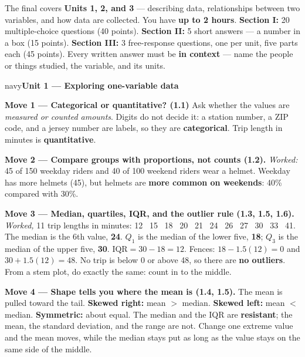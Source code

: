 \documentclass[12pt]{article}
\newcommand{\sghead}[2][10]{%
  \vspace{0.13in}
  \boxguard[#1]
  \begin{headlinebox}{navy}\color{white}\bfseries\small #2\end{headlinebox}
  \vspace{0.09in}}
\begin{document}

\vspace{0.12in}

\boxguard[9]
\begin{remindbox}
\small
The final covers \textbf{Units 1, 2, and 3} --- describing data, relationships between two
variables, and how data are collected. You have \textbf{up to 2 hours}. \textbf{Section I:} 20
multiple-choice questions (40 points). \textbf{Section II:} 5 short answers --- a number in a
box (15 points). \textbf{Section III:} 3 free-response questions, one per unit, five parts each
(45 points). Every written answer must be \textbf{in context} --- name the people or things
studied, the variable, and its units.
\end{remindbox}

\sghead{Unit 1 --- Exploring one-variable data}

\small
\textbf{Move 1 --- Categorical or quantitative? (1.1)} Ask whether the values are \emph{measured
or counted amounts}. Digits do not decide it: a station number, a ZIP code, and a jersey number
are labels, so they are \textbf{categorical}. Trip length in minutes is \textbf{quantitative}.

\vspace{3pt}
\textbf{Move 2 --- Compare groups with proportions, not counts (1.2).} \emph{Worked:} 45 of 150
weekday riders and 40 of 100 weekend riders wear a helmet. Weekday has more helmets (45), but
helmets are \textbf{more common on weekends}: 40\% compared with 30\%.

\vspace{3pt}
\textbf{Move 3 --- Median, quartiles, IQR, and the outlier rule (1.3, 1.5, 1.6).} \emph{Worked,}
11 trip lengths in minutes: 12 \ 15 \ 18 \ 20 \ 21 \ 24 \ 26 \ 27 \ 30 \ 33 \ 41. The median is
the 6th value, \textbf{24}. $Q_1$ is the median of the lower five, \textbf{18}; $Q_3$ is the
median of the upper five, \textbf{30}. $\text{IQR} = 30 - 18 = 12$. Fences:
$18 - 1.5(12) = 0$ and $30 + 1.5(12) = 48$. No trip is below 0 or above 48, so there are
\textbf{no outliers}. From a stem plot, do exactly the same: count in to the middle.

\vspace{3pt}
\textbf{Move 4 --- Shape tells you where the mean is (1.4, 1.5).} The mean is pulled toward the
tail. \textbf{Skewed right:} mean $>$ median. \textbf{Skewed left:} mean $<$ median.
\textbf{Symmetric:} about equal. The median and the IQR are \textbf{resistant}; the mean, the
standard deviation, and the range are not. Change one extreme value and the mean moves, while
the median stays put as long as the value stays on the same side of the middle.
\end{document}
